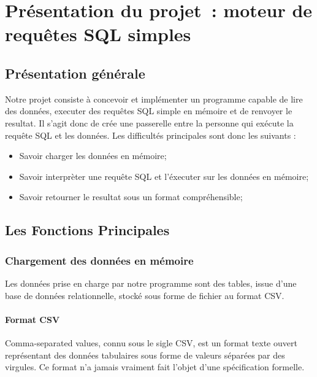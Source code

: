 \documentclass[oneside,13pt,a4paper]{report}
\begin{document}
\chapter{Présentation du projet : moteur de requêtes SQL simples}

\section{Présentation générale}

Notre projet consiste à concevoir et implémenter un programme capable de lire des données, executer des requêtes SQL simple en mémoire et de renvoyer le resultat.
Il s’agit donc de crée une passerelle entre la personne qui exécute la requête SQL et les données.
Les difficultés principales sont donc les suivants :
\vspace{0.3cm}
\begin{itemize}
	\item Savoir charger les données en mémoire;
	\item Savoir interprèter une requête SQL et l'éxecuter sur les données en mémoire;
	\item Savoir retourner le resultat sous un format compréhensible;
\end{itemize}
\vspace{0.3cm}

\section{Les Fonctions Principales}

\subsection{Chargement des données en mémoire}

Les données prise en charge par notre programme sont des tables, issue d'une base de données relationnelle, stocké sous forme de fichier au format CSV.

\subsubsection{Format CSV}
\label{csv}
Comma-separated values, connu sous le sigle CSV, est un format texte ouvert %
représentant des données tabulaires sous forme de valeurs séparées par des virgules. 
Ce format n'a jamais vraiment fait l'objet d'une spécification formelle.
\end{document}
